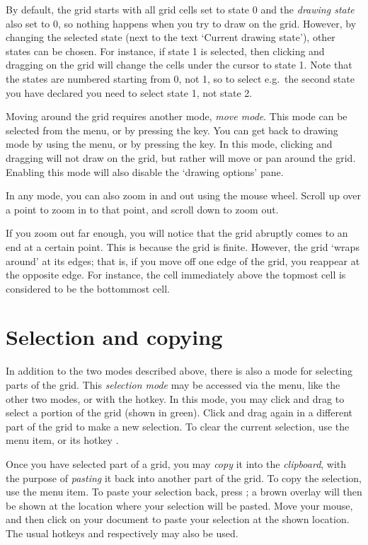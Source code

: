 \documentclass[oneside,a4paper]{memoir}
\begin{document}
By default, the grid starts with all grid cells set to state 0 and the \emph{drawing state} also set to 0,
  so nothing happens when you try to draw on the grid.
However, by changing the selected state (next to the text `Current drawing state'), other states can be chosen.
For instance, if state 1 is selected, then clicking and dragging on the grid will change the cells under the cursor to state 1.
Note that the states are numbered starting from 0, not 1,
  so to select e.g.\ the second state you have declared you need to select state 1, not state 2.

Moving around the grid requires another mode, \emph{move mode}.
This mode can be selected from the  menu, or by pressing the  key.
You can get back to drawing mode by using the  menu, or by pressing the  key.
In this mode, clicking and dragging will not draw on the grid, but rather will move or pan around the grid.
Enabling this mode will also disable the `drawing options' pane.

In any mode, you can also zoom in and out using the mouse wheel.
Scroll up over a point to zoom in to that point, and scroll down to zoom out.

If you zoom out far enough, you will notice that the grid abruptly comes to an end at a certain point.
This is because the grid is finite.
However, the grid `wraps around' at its edges; that is, if you move off one edge of the grid, you reappear at the opposite edge.
For instance, the cell immediately above the topmost cell is considered to be the bottommost cell.

\section{Selection and copying}
\label{sec:selcopy}

In addition to the two modes described above, there is also a mode for selecting parts of the grid.
This \emph{selection mode} may be accessed via the  menu, like the other two modes,
  or with the  hotkey.
In this mode, you may click and drag to select a portion of the grid (shown in green).
Click and drag again in a different part of the grid to make a new selection.
To clear the current selection, use the \hbox{} menu item,
  or its hotkey .

Once you have selected part of a grid, you may \emph{copy} it into the \emph{clipboard},
  with the purpose of \emph{pasting} it back into another part of the grid.
To copy the selection, use the  menu item.
To paste your selection back, press ;
  a brown overlay will then be shown at the location where your selection will be pasted.
Move your mouse, and then click on your document to paste your selection at the shown location.
The usual hotkeys  and  respectively may also be used.
\end{document}
